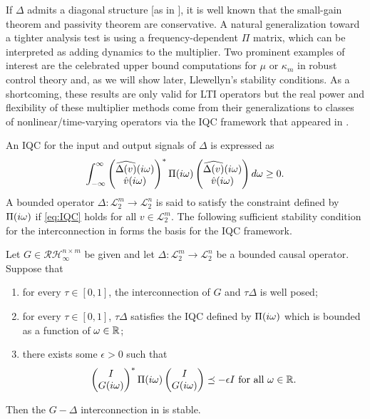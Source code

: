 If $\Delta$ admits a diagonal structure [as in ], it is well known that the small-gain theorem 
and passivity theorem are conservative. A natural generalization toward a tighter analysis test is using a frequency-dependent 
$\Pi$ matrix, {which can be interpreted as} adding dynamics to the multiplier. Two prominent examples of 
interest are the celebrated upper bound computations for $\mu$ or $\kappa_m$ in robust control theory and, as we will 
show later, Llewellyn's stability conditions. As a shortcoming, these results are only valid for LTI operators but the 
real power and flexibility of these multiplier methods come from {their} generalizations to classes of nonlinear/time-varying 
operators via the IQC framework that appeared in \cite{megretski}.

An IQC for the input and output signals of $\Delta$ is expressed as
\begin{equation}{\displaystyle\ensuremath{\int_{-\infty}^\infty{\begin{pmatrix}\widehat{\Delta(v)}(i\omega)\\\hat{v}(i\omega)\end{pmatrix}^*\Pi(i\omega)\begin{pmatrix}\widehat{\Delta(v)}(i\omega)\\\hat{v}(i\omega)\end{pmatrix}d\omega}}} \geq 0.
\label{eq:IQC}
\end{equation}
A bounded operator $\Delta:\mathcal{L}^m_2\to\mathcal{L}^n_2$ is said to satisfy the constraint defined by $\Pi(i\omega)$ 
if \eqref{eq:IQC} holds for all $v\in\mathcal{L}^m_2$. The following sufficient {stability condition for the interconnection 
in } forms the basis for the IQC framework. 
\begin{thm}\label{IQCthm} Let $G\in\mathcal{RH}^{n\times m}_\infty$ be given and 
let $\Delta:\mathcal{L}^m_2\to\mathcal{L}^n_2$ be a bounded causal operator. Suppose that
\begin{enumerate}
	\item for every $\tau\in[0,1]$, the interconnection of $G$ and $\tau\Delta$ is well posed;
	\item for every $\tau\in[0,1]$, $\tau\Delta$ satisfies the IQC 
    defined by $\Pi(i\omega)$ which is bounded as a function of $\omega\in\mathbb{R}$;
	\item there exists some $\epsilon>0$ such that
	\begin{equation}
	\begin{pmatrix}I\\G(i\omega)\end{pmatrix}^*\Pi(i\omega)\begin{pmatrix}I\\G(i\omega)\end{pmatrix} \preceq -\epsilon I\text{\ for all\ }\omega\in\mathbb{\mathbb{R}}.
	\label{eq:IQCthmFDI}
	\end{equation}
\end{enumerate}
Then the $G-\Delta$ interconnection {in }  is stable.
\end{thm}

